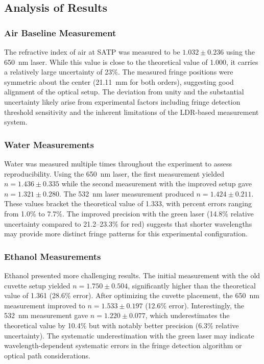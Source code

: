 \subsection{Analysis of Results}
\label{subsec:analysis-of-results}

\subsubsection{Air Baseline Measurement}

The refractive index of air at SATP was measured to be
$1.032 \pm 0.236$ using the 650~nm laser.
While this value is close to the theoretical value of 1.000, it carries
a relatively large uncertainty of 23\%.
The measured fringe positions were symmetric about the center (21.11~mm
for both orders), suggesting good alignment of the optical setup.
The deviation from unity and the substantial uncertainty likely arise
from experimental factors including fringe detection threshold
sensitivity and the inherent limitations of the LDR-based measurement
system.

\subsubsection{Water Measurements}

Water was measured multiple times throughout the experiment to assess
reproducibility.
Using the 650~nm laser, the first measurement yielded
$n = 1.436 \pm 0.335$ while the second measurement with the improved
setup gave $n = 1.321 \pm 0.280$.
The 532~nm laser measurement produced $n = 1.424 \pm 0.211$.
These values bracket the theoretical value of 1.333, with percent
errors ranging from 1.0\% to 7.7\%.
The improved precision with the green laser (14.8\% relative
uncertainty compared to 21.2--23.3\% for red) suggests that shorter
wavelengths may provide more distinct fringe patterns for this
experimental configuration.

\subsubsection{Ethanol Measurements}

Ethanol presented more challenging results.
The initial measurement with the old cuvette setup yielded
$n = 1.750 \pm 0.504$, significantly higher than the theoretical value
of 1.361 (28.6\% error).
After optimizing the cuvette placement, the 650~nm measurement improved
to $n = 1.533 \pm 0.197$ (12.6\% error).
Interestingly, the 532~nm measurement gave $n = 1.220 \pm 0.077$, which
underestimates the theoretical value by 10.4\% but with notably better
precision (6.3\% relative uncertainty).
The systematic underestimation with the green laser may indicate
wavelength-dependent systematic errors in the fringe detection
algorithm or optical path considerations.

